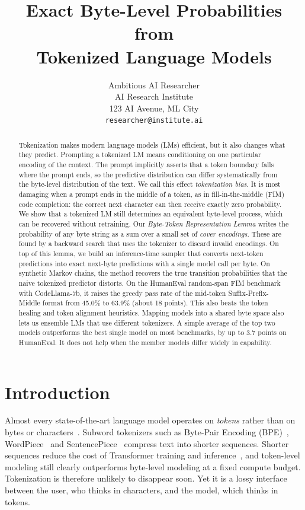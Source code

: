 \documentclass{article} %
\title{Exact Byte-Level Probabilities from \\ Tokenized Language Models}
\author{Ambitious AI Researcher\\
AI Research Institute\\
123 AI Avenue, ML City\\
\texttt{researcher@institute.ai}
}
\begin{document}
\maketitle

\begin{abstract}
Tokenization makes modern language models (LMs) efficient, but it also changes what they predict. Prompting a tokenized LM means conditioning on one particular encoding of the context. The prompt implicitly asserts that a token boundary falls where the prompt ends, so the predictive distribution can differ systematically from the byte-level distribution of the text. We call this effect \emph{tokenization bias}. It is most damaging when a prompt ends in the middle of a token, as in fill-in-the-middle (FIM) code completion: the correct next character can then receive exactly zero probability. We show that a tokenized LM still determines an equivalent byte-level process, which can be recovered without retraining. Our \emph{Byte-Token Representation Lemma} writes the probability of any byte string as a sum over a small set of \emph{cover encodings}. These are found by a backward search that uses the tokenizer to discard invalid encodings. On top of this lemma, we build an inference-time sampler that converts next-token predictions into exact next-byte predictions with a single model call per byte. On synthetic Markov chains, the method recovers the true transition probabilities that the naive tokenized predictor distorts. On the HumanEval random-span FIM benchmark with CodeLlama-7b, it raises the greedy pass rate of the mid-token Suffix-Prefix-Middle format from 45.0\% to 63.9\% (about 18 points). This also beats the token healing and token alignment heuristics. Mapping models into a shared byte space also lets us ensemble LMs that use different tokenizers. A simple average of the top two models outperforms the best single model on most benchmarks, by up to 3.7 points on HumanEval. It does not help when the member models differ widely in capability.
\end{abstract}

\section{Introduction}
\label{sec:intro}
Almost every state-of-the-art language model operates on \emph{tokens} rather than on bytes or characters~\citep{radford2019language,brown2020language,touvron2023llama,jiang2023mistral}. Subword tokenizers such as Byte-Pair Encoding (BPE)~\citep{sennrich2016neural}, WordPiece~\citep{schuster2012japanese} and SentencePiece~\citep{kudo2018sentencepiece} compress text into shorter sequences. Shorter sequences reduce the cost of Transformer training and inference~\citep{vaswani2017attention}, and token-level modeling still clearly outperforms byte-level modeling at a fixed compute budget. Tokenization is therefore unlikely to disappear soon. Yet it is a lossy interface between the user, who thinks in characters, and the model, which thinks in tokens.
\end{document}
